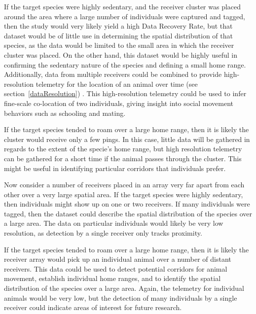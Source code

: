 If the target species were highly sedentary, and the receiver cluster was placed around the area where a large number of individuals were captured and tagged, then the study would very likely yield a high Data Recovery Rate, but that dataset would be of little use in determining the spatial distribution of that species, as the data would be limited to the small area in which the receiver cluster was placed.  On the other hand, this dataset would be highly useful in confirming the sedentary nature of the species and defining a small home range.  Additionally, data from multiple receivers could be combined to provide high-resolution telemetry for the location of an animal over time (see section~\ref{dataResolution}) \cite{Heupel2006}.  This high-resolution telemetry could be used to infer fine-scale co-location of two individuals, giving insight into social movement behaviors such as schooling and mating.  

If the target species tended to roam over a large home range, then it is likely the cluster would receive only a few pings.  In this case, little data will be gathered in regards to the extent of the specie's home range, but high resolution telemetry can be gathered for a short time if the animal passes through the cluster.  This might be useful in identifying particular corridors that individuals prefer.

Now consider a number of receivers placed in an array very far apart from each other over a very large spatial area.
If the target species were highly sedentary, then individuals might show up on one or two receivers.  If many individuals were tagged, then the dataset could describe the spatial distribution of the species over a large area.  The data on particular individuals would likely be very low resolution, as detection by a single receiver only tracks proximity.  

If the target species tended to roam over a large home range, then it is likely the receiver array would pick up an individual animal over a number of distant receivers.  This data could be used to detect potential corridors for animal movement, establish individual home ranges, and to identify the spatial distribution of the species over a large area.  Again, the telemetry for individual animals would be very low, but the detection of many individuals by a single receiver could indicate areas of interest for future research.

